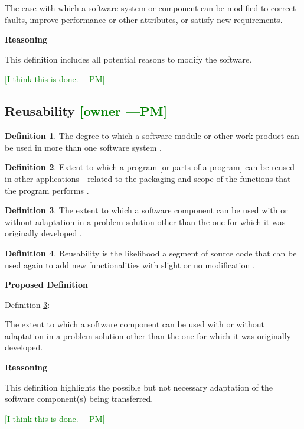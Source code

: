 \documentclass[letterpaper,cleveref]{lipics-v2019}
\newcommand{\authornote}[3]{\textcolor{#1}{[#3 ---#2]}}
\newcommand{\authornote}[3]{}
\newcommand{\pmi}[1]{\authornote{green}{PM}{#1}} %
\theoremstyle{definition}
\newtheorem{defn}{Definition}
\begin{document}
The ease with which a software system or component can be modified to correct
faults, improve performance or other attributes, or satisfy new requirements.

\noindent \textbf{Reasoning}

This definition includes all potential reasons to modify the software. 

\pmi{I think this is done.}

\subsection{Reusability \pmi{owner}}

\begin{defn} 
The degree to which a software module or other work product can be used in more
than one software system \citep{IEEEStdGlossarySET1990}. 
\end{defn}
\begin{defn}
Extent to which a program [or parts of a program] can be reused in other
applications - related to the packaging and scope of the functions that the
program performs \citep{pressman2005software}.
\end{defn}
\begin{defn} \label{ReusabilityDefnSelected}
The extent to which a software component can be used with or without adaptation
in a problem solution other than the one for which it was originally developed
\citep{kalagiakos2003non}.
\end{defn}
\begin{defn}
Reusability is the likelihood a segment of source code that can be used again to
add new functionalities with slight or no modification \citep{sandhu2010survey}.
\end{defn}

\noindent \textbf{Proposed Definition}

Definition \ref{ReusabilityDefnSelected}:

The extent to which a software component can be used with or without adaptation
in a problem solution other than the one for which it was originally developed.

\noindent \textbf{Reasoning}

This definition highlights the possible but not necessary adaptation of the
software component(s) being transferred.

\pmi{I think this is done.}
\end{document}
